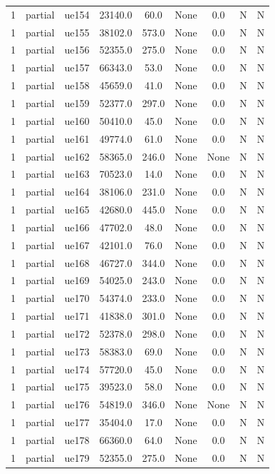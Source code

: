 \begin{table}[ht]
\begin{tabular}{|c|c|c|c|c|c|c|c|c|}
1 & partial & ue154 & 23140.0 & 60.0 & None & 0.0 & N & N \\
1 & partial & ue155 & 38102.0 & 573.0 & None & 0.0 & N & N \\
1 & partial & ue156 & 52355.0 & 275.0 & None & 0.0 & N & N \\
1 & partial & ue157 & 66343.0 & 53.0 & None & 0.0 & N & N \\
1 & partial & ue158 & 45659.0 & 41.0 & None & 0.0 & N & N \\
1 & partial & ue159 & 52377.0 & 297.0 & None & 0.0 & N & N \\
1 & partial & ue160 & 50410.0 & 45.0 & None & 0.0 & N & N \\
1 & partial & ue161 & 49774.0 & 61.0 & None & 0.0 & N & N \\
1 & partial & ue162 & 58365.0 & 246.0 & None & None & N & N \\
1 & partial & ue163 & 70523.0 & 14.0 & None & 0.0 & N & N \\
1 & partial & ue164 & 38106.0 & 231.0 & None & 0.0 & N & N \\
1 & partial & ue165 & 42680.0 & 445.0 & None & 0.0 & N & N \\
1 & partial & ue166 & 47702.0 & 48.0 & None & 0.0 & N & N \\
1 & partial & ue167 & 42101.0 & 76.0 & None & 0.0 & N & N \\
1 & partial & ue168 & 46727.0 & 344.0 & None & 0.0 & N & N \\
1 & partial & ue169 & 54025.0 & 243.0 & None & 0.0 & N & N \\
1 & partial & ue170 & 54374.0 & 233.0 & None & 0.0 & N & N \\
1 & partial & ue171 & 41838.0 & 301.0 & None & 0.0 & N & N \\
1 & partial & ue172 & 52378.0 & 298.0 & None & 0.0 & N & N \\
1 & partial & ue173 & 58383.0 & 69.0 & None & 0.0 & N & N \\
1 & partial & ue174 & 57720.0 & 45.0 & None & 0.0 & N & N \\
1 & partial & ue175 & 39523.0 & 58.0 & None & 0.0 & N & N \\
1 & partial & ue176 & 54819.0 & 346.0 & None & None & N & N \\
1 & partial & ue177 & 35404.0 & 17.0 & None & 0.0 & N & N \\
1 & partial & ue178 & 66360.0 & 64.0 & None & 0.0 & N & N \\
1 & partial & ue179 & 52355.0 & 275.0 & None & 0.0 & N & N \\

\end{tabular}
\end{table}
